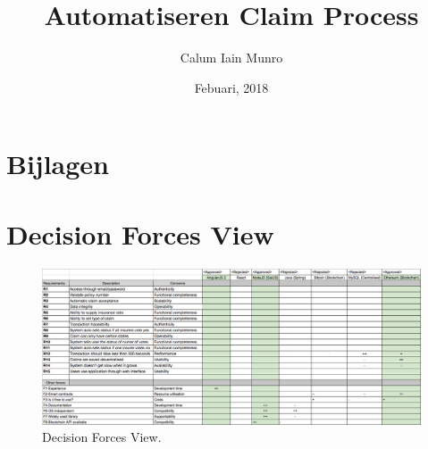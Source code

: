 \documentclass[firstyr,a4paper,oneside]{cam-thesis}%
\title{Automatiseren Claim Process}
\author{Calum Iain Munro}
\date{Febuari, 2018}
\let\cleardoublepage=\clearpage
\begin{document}


\frontmatter{}

\setlength{\parindent}{0em}
\setlength{\parskip}{1em}


%
%







{}



\chapter{Bijlagen}
\appendix
\chapter{Decision Forces View}\label{appendix:decisionForcesView}
\begin{figure}[h!]
    \begin{center}
        \includegraphics[width=\paperwidth-100]{images/decisonForcesView}
        \caption{Decision Forces View.}
    \end{center}
\end{figure}

\newpage
\end{document}
